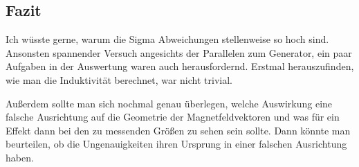 \subsection{Fazit}
Ich wüsste gerne, warum die Sigma Abweichungen stellenweise so hoch sind. Ansonsten spannender Versuch angesichts der Parallelen zum Generator, ein paar Aufgaben in der Auswertung waren auch herausfordernd. Erstmal herauszufinden, wie man die Induktivität berechnet, war nicht trivial.

Außerdem sollte man sich nochmal genau überlegen, welche Auswirkung eine falsche Ausrichtung auf die Geometrie der Magnetfeldvektoren und was für ein Effekt dann bei den zu messenden Größen zu sehen sein sollte. Dann könnte man beurteilen, ob die Ungenauigkeiten ihren Ursprung in einer falschen Ausrichtung haben.
